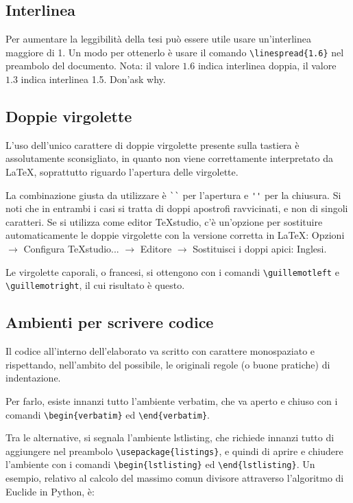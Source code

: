 \documentclass[12pt]{report}
\begin{document}
\subsection{Interlinea}

Per aumentare la leggibilit\`a della tesi pu\`o essere utile usare un'interlinea maggiore di 1. Un modo per ottenerlo \`e usare il comando \verb|\linespread{1.6}| nel preambolo del documento. Nota: il valore $1.6$ indica interlinea doppia, il valore $1.3$ indica interlinea 1.5. Don'ask why.


\subsection{Doppie virgolette}

L'uso dell'unico carattere di doppie virgolette presente sulla tastiera è assolutamente sconsigliato, in quanto non viene correttamente interpretato da \LaTeX, soprattutto riguardo l'apertura delle virgolette.

La combinazione giusta da utilizzare è \verb|``| per l'apertura e \verb|''| per la chiusura. Si noti che in entrambi i casi si tratta di doppi apostrofi ravvicinati, e non di singoli caratteri. Se si utilizza come editor TeXstudio, c'è un'opzione per sostituire automaticamente le doppie virgolette con la versione corretta in \LaTeX: Opzioni $\rightarrow$ Configura TeXstudio... $\rightarrow$ Editore $\rightarrow$ Sostituisci i doppi apici: Inglesi.

Le virgolette caporali, o francesi, si ottengono con i comandi \verb|\guillemotleft| e \break\verb|\guillemotright|, il cui risultato è \guillemotleft questo\guillemotright.


\subsection{Ambienti per scrivere codice}

Il codice all'interno dell'elaborato va scritto con carattere monospaziato e rispettando, nell'ambito del possibile, le originali regole (o buone pratiche) di indentazione.

Per farlo, esiste innanzi tutto l'ambiente verbatim, che va aperto e chiuso con i comandi \verb|\begin{verbatim}| ed \verb|\end{verbatim}|.

Tra le alternative, si segnala l'ambiente lstlisting, che richiede innanzi tutto di aggiungere nel preambolo \verb|\usepackage{listings}|, e quindi di aprire e chiudere l'ambiente con i comandi \verb|\begin{lstlisting}| ed \verb|\end{lstlisting}|. Un esempio, relativo al calcolo del massimo comun divisore attraverso l'algoritmo di Euclide in Python, è:
\end{document}
